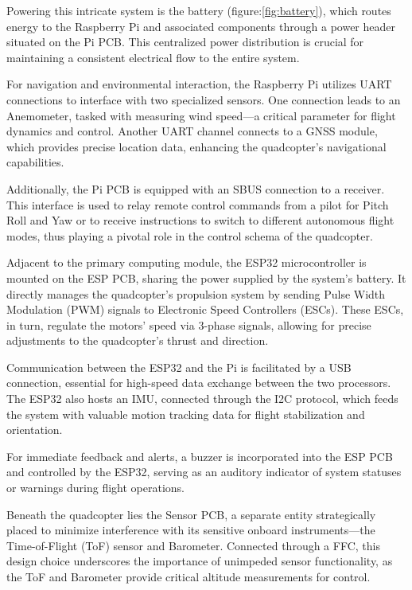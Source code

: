 \documentclass{article}
\begin{document}
Powering this intricate system is the battery (figure:\ref{fig:battery}), which routes energy to the Raspberry Pi and associated components through a power header situated on the Pi PCB. This centralized power distribution is crucial for maintaining a consistent electrical flow to the entire system.

For navigation and environmental interaction, the Raspberry Pi utilizes UART connections to interface with two specialized sensors. One connection leads to an Anemometer, tasked with measuring wind speed—a critical parameter for flight dynamics and control. Another UART channel connects to a GNSS module, which provides precise location data, enhancing the quadcopter's navigational capabilities.

Additionally, the Pi PCB is equipped with an SBUS connection to a receiver. This interface is used to relay remote control commands from a pilot for Pitch Roll and Yaw or to receive instructions to switch to different autonomous flight modes, thus playing a pivotal role in the control schema of the quadcopter.

Adjacent to the primary computing module, the ESP32 microcontroller is mounted on the ESP PCB, sharing the power supplied by the system's battery. It directly manages the quadcopter's propulsion system by sending Pulse Width Modulation (PWM) signals to Electronic Speed Controllers (ESCs). These ESCs, in turn, regulate the motors' speed via 3-phase signals, allowing for precise adjustments to the quadcopter's thrust and direction.

Communication between the ESP32 and the Pi is facilitated by a USB connection, essential for high-speed data exchange between the two processors. The ESP32 also hosts an IMU, connected through the I2C protocol, which feeds the system with valuable motion tracking data for flight stabilization and orientation.

For immediate feedback and alerts, a buzzer is incorporated into the ESP PCB and controlled by the ESP32, serving as an auditory indicator of system statuses or warnings during flight operations.

Beneath the quadcopter lies the Sensor PCB, a separate entity strategically placed to minimize interference with its sensitive onboard instruments—the Time-of-Flight (ToF) sensor and Barometer. Connected through a FFC, this design choice underscores the importance of unimpeded sensor functionality, as the ToF and Barometer provide critical altitude measurements for control.
\end{document}
